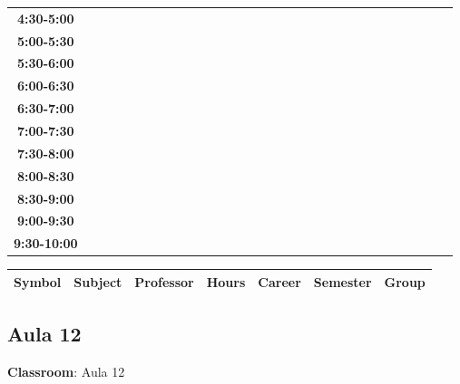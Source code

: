 \documentclass{article}
\begin{document}
\begin{table}[ht]
\begin{tabular}{|c|c|c|c|c|c|c|c|c|c|c|c|c|c|c|c|c|c|c|c|c|c|c|c|c|c|c|c|c|c|}
 \cline{1-8} 
\textbf{4:30-5:00} &   &   &   &   &   &   &   \\
 \cline{1-8} 
\textbf{5:00-5:30} &   &   &   &   &   &   &   \\
 \cline{1-8} 
\textbf{5:30-6:00} &   &   &   &   &   &   &   \\
 \cline{1-8} 
\textbf{6:00-6:30} &   &   &   &   &   &   &   \\
 \cline{1-8} 
\textbf{6:30-7:00} &   &   &   &   &   &   &   \\
 \cline{1-8} 
\textbf{7:00-7:30} &   &   &   &   &   &   &   \\
 \cline{1-8} 
\textbf{7:30-8:00} &   &   &   &   &   &   &   \\
 \cline{1-8} 
\textbf{8:00-8:30} &   &   &   &   &   &   &   \\
 \cline{1-8} 
\textbf{8:30-9:00} &   &   &   &   &   &   &   \\
 \cline{1-8} 
\textbf{9:00-9:30} &   &   &   &   &   &   &   \\
 \cline{1-8} 
\textbf{9:30-10:00} &   &   &   &   &   &   &   \\
 \cline{1-8} 
\end{tabular}\end{table}

        
        \begin{tabular}{|>{\centering\arraybackslash}m{2cm}|>{\centering\arraybackslash}m{4cm}|>{\centering\arraybackslash}m{2.15cm}|>{\centering\arraybackslash}m{1.8cm}|>{\centering\arraybackslash}m{2cm}|>{\centering\arraybackslash}m{2cm}|>{\centering\arraybackslash}m{2cm}|}
        \hline
        \textbf{Symbol} & \textbf{Subject} & \textbf{Professor} & \textbf{Hours} & \textbf{Career} & \textbf{Semester} & \textbf{Group} \\
        \hline
        \end{tabular}
                    

        \newpage
        

        \subsection{Aula 12}
        \vspace*{.1cm}
        
        \begin{flushright}
            {\LARGE \textbf{Classroom}: Aula 12}
        \end{flushright}
        \vspace{1cm}
\end{document}
